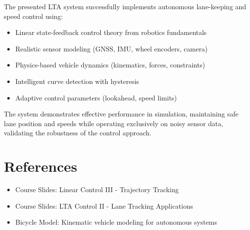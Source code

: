 \documentclass[11pt,a4paper]{article}
\begin{document}
The presented LTA system successfully implements autonomous lane-keeping and speed control using:
\begin{itemize}
    \item Linear state-feedback control theory from robotics fundamentals
    \item Realistic sensor modeling (GNSS, IMU, wheel encoders, camera)
    \item Physics-based vehicle dynamics (kinematics, forces, constraints)
    \item Intelligent curve detection with hysteresis
    \item Adaptive control parameters (lookahead, speed limits)
\end{itemize}

The system demonstrates effective performance in simulation, maintaining safe lane position and speeds while operating exclusively on noisy sensor data, validating the robustness of the control approach.

\section{References}

\begin{itemize}
    \item Course Slides: Linear Control III - Trajectory Tracking
    \item Course Slides: LTA Control II - Lane Tracking Applications
    \item Bicycle Model: Kinematic vehicle modeling for autonomous systems
\end{itemize}
\end{document}
